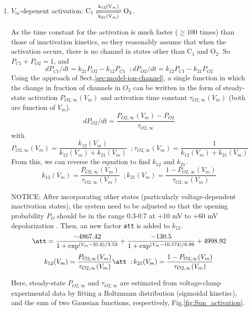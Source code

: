 \begin{enumerate}
  \item $V_m$-depenent activation: $\ce{C1 <=>[k_{12}(V_m)][k_{21}(V_m)] O2}$.
  
  As the time constant for the activation is much faster ($\ge 100$ times) than
  those of inactivation kinetics, so they reasonably assume that when the
  activation occurs, there is no channel in states other than C$_1$ and
  O$_2$. So $P_{C1}+P_{O2}=1$, and
  \begin{equation}
  dP_{C1}/dt = k_{21}P_{O2} - k_{12}P_{C1} \;\;; dP_{O2}/dt =
  k_{12}P_{C1}-k_{21}P_{O2}
  \end{equation}
Using the approach of Sect.\ref{sec:model-ion-channel}, a single function in
which the change in fraction of channels in $O_2$ can be written in the form of
steady-state activation $P_{O2,\infty} (V_m)$ and activation time constant
$\tau_{O2,\infty} (V_m)$ (both are function of $V_m$).
\begin{equation}
dP_{O2}/dt = \frac{P_{O2,\infty}(V_m)-P_{O2}}{\tau_{O2,\infty}}
\end{equation}
with 
\begin{equation}
P_{O2,\infty}(V_m)=\frac{k_{12}(V_m)}{k_{12}(V_m)+k_{21}(V_m)} \;\;; 
\tau_{O2,\infty}(V_m)=\frac{1}{k_{12}(V_m)+k_{21}(V_m)} 
\end{equation}
From this, we can reverse the equation to find $k_{12}$ and $k_{21}$.
\begin{equation*}
k_{12}(V_m)=\frac{P_{O2,\infty}(V_m)}{\tau_{O2,\infty}(V_m)} \;\;;
k_{21}(V_m)=\frac{1-P_{O2,\infty}(V_m)}{\tau_{O2,\infty}(V_m)} 
\end{equation*}

NOTICE: After incorporating other states (particularly voltage-dependent
inactivation states), the system need to be adjusted so that the opening
probability $P_O$ should be in the range 0.3-0.7 at +10 mV to +60 mV
depolarization \citep{cachelin1983}. Then, an new factor \verb!att! is added to
$k_{12}$.
\begin{equation}
\att = \frac{-4867.42}{1+\exp^{(V_m-35.0)/3.53}} +
\frac{-130.5}{1+\exp^{(V_m-10.574)/0.89}} + 4998.92
\end{equation}
\begin{equation}
k_{12}(V_m)=\frac{P_{O2,\infty}(V_m)}{\tau_{O2,\infty}(V_m)} \att \;\;;
k_{21}(V_m)=\frac{1-P_{O2,\infty}(V_m)}{\tau_{O2,\infty}(V_m)} 
\end{equation}

Here, steady-state $P_{O2,\infty}$ and $\tau_{O2,\infty}$ are estimated from
voltage-clamp experimental data by fitting a Boltzmann distribution (sigmoidal
kinetisc), and the sum of two Gaussian functions, respectively,
Fig.\ref{fig:Sun_activation}. 


\end{enumerate}
